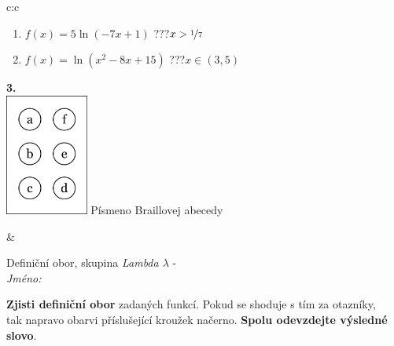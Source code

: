 \documentclass[10pt]{report}
\begin{document}
\begin{tabular}{c:c}
\begin{minipage}[c][104.5mm][t]{0.5\linewidth}
\begin{center}
\begin{minipage}{0.79\linewidth}
\begin{center}
\begin{varwidth}{\linewidth}
\begin{enumerate}
\item $f(x)=5\ln{(-7x+1)}$\quad \dotfill\; ???\;\dotfill \quad $x>\nicefrac{1}{7}$
\item $f(x)=\ln{(x^2-8x+15)}$\quad \dotfill\; ???\;\dotfill \quad $x\in(3 , 5)$
\end{enumerate}
\end{varwidth}
\end{center}
\end{minipage}
\begin{minipage}{0.20\linewidth}
\begin{center}
{\Huge\bfseries 3.} \\[2mm]
\includegraphics[height=40mm]{../images/braille.png}
{\small Písmeno Braillovej abecedy}
\end{center}
\end{minipage}
\end{center}
\end{minipage}
&
\begin{minipage}[c][104.5mm][t]{0.5\linewidth}
\begin{center}
\vspace{7mm}
{\huge Definiční obor, skupina \textit{Lambda $\lambda$} -}\\[5mm]
\textit{Jméno:}\phantom{xxxxxxxxxxxxxxxxxxxxxxxxxxxxxxxxxxxxxxxxxxxxxxxxxxxxxxxxxxxxxxxxx}\\[5mm]
\begin{minipage}{0.95\linewidth}
\begin{center}
\textbf{Zjisti definiční obor} zadaných funkcí. Pokud se shoduje s tím za otazníky,\\tak napravo obarvi příslušející kroužek načerno. \textbf{Spolu odevzdejte výsledné slovo}.
\end{center}
\end{minipage}
\\[1mm]
\begin{minipage}{0.79\linewidth}
\begin{center}
\begin{varwidth}{\linewidth}
\begin{enumerate}
\normalsizerrr

\end{enumerate}
\end{varwidth}
\end{center}
\end{minipage}
\end{center}
\end{minipage}
\end{tabular}
\end{document}
